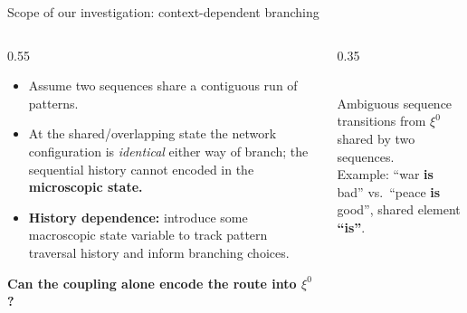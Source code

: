 \documentclass[aspectratio=169]{beamer}
\newcommand{\xxi}{\xi}
\begin{document}
\begin{frame}{Scope of our investigation: context-dependent branching}
  \begin{columns}
    \begin{column}{0.55\textwidth}
      \begin{itemize}
        \item Assume two sequences share a contiguous run of patterns.
        \item At the shared/overlapping state the network configuration is
          \emph{identical} either way of branch; the sequential history  cannot encoded in the \textbf{microscopic state.}
        \item \textbf{History dependence:} introduce some macroscopic state variable to track pattern traversal history and inform branching choices.
      \end{itemize}
      \vspace{2mm}
      \centering\textbf{Can the coupling alone encode the route into $\xxi^0$?}
    \end{column}
    \begin{column}{0.35\textwidth}
      \centering
      \\[2mm]
      {\small Ambiguous sequence transitions from $\xxi^0$ shared by two sequences.\\
      Example: ``war \textbf{is} bad'' vs.\ ``peace \textbf{is} good'', shared element \textbf{``is''}.}
    \end{column}
  \end{columns}
\end{frame}
\end{document}
